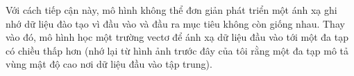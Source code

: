 Với cách tiếp cận này, mô hình không thể đơn giản
phát triển một ánh xạ ghi nhớ dữ liệu đào tạo vì đầu vào và đầu
ra mục tiêu không còn giống nhau. Thay vào đó, mô
hình học một trường vectơ để ánh xạ dữ liệu đầu vào tới một đa
tạp có chiều thấp hơn (nhớ lại từ hình ảnh trước đây của tôi rằng
một đa tạp mô tả vùng mật độ cao nơi dữ liệu đầu vào tập trung).




